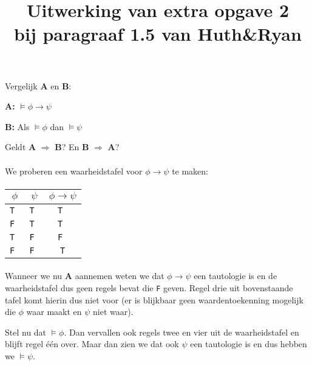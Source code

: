\documentclass[a4paper,11pt]{article}
\title{Uitwerking van extra opgave 2\\
\normalsize{bij paragraaf 1.5 van Huth\&Ryan}}
\date{}
\begin{document}
\maketitle


Vergelijk \textbf{A} en \textbf{B}:

\begin{description}

\item{\bf A:}
$\models \phi \rightarrow \psi$

\item{\bf B:}
Als $\models \phi$ dan $\models \psi$

\end{description}

Geldt \textbf{A} $\Rightarrow$ \textbf{B}? En \textbf{B} $\Rightarrow$ \textbf{A}?

\paragraph{}

We proberen een waarheidstafel voor $\phi \rightarrow \psi$ te maken:

\paragraph{}

\begin{tabular}{c|c|c}
$\phi$   & $\psi$   & $\phi \rightarrow \psi$ \\
\hline
\tt T    & \tt T    & \tt T \\
\tt F    & \tt T    & \tt T \\
\tt T    & \tt F    & \tt F \\
\tt F    & \tt F    & \tt T
\end{tabular}

\paragraph{}

Wanneer we nu \textbf{A} aannemen weten we dat $\phi \rightarrow \psi$
een tautologie is en de waarheidstafel dus geen regels bevat
die \texttt{F} geven. Regel drie uit bovenstaande tafel komt hierin
dus niet voor (er is blijkbaar geen waardentoekenning mogelijk die
$\phi$ waar maakt en $\psi$ niet waar).

Stel nu dat $\models \phi$. Dan vervallen ook regels twee en vier
uit de waarheidstafel en blijft regel \'e\'en over. Maar dan zien
we dat ook $\psi$ een tautologie is en dus hebben we $\models \psi$.
\end{document}

